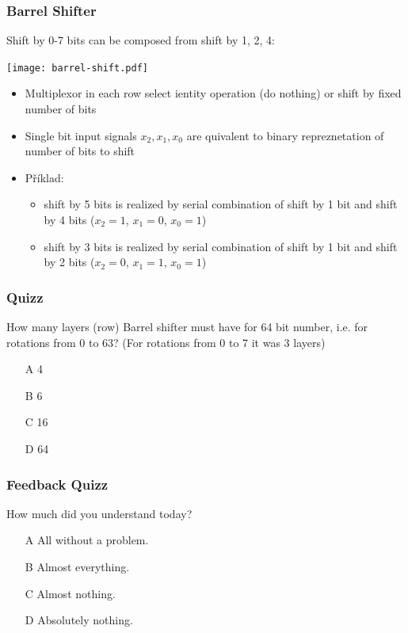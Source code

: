 \documentclass{beamer}
\begin{document}
\begin{frame}
\frametitle{Barrel Shifter}

Shift by 0-7 bits can be composed from shift by 1, 2, 4:
\begin{center}
   \texttt{[image: barrel-shift.pdf]}
\end{center}

\begin{itemize}
\item Multiplexor in each row select ientity operation (do nothing) or shift by fixed number of bits
\item Single bit input signals $x_2,x_1,x_0$ are quivalent to binary repreznetation of number of bits to shift
\item Příklad:
\begin{itemize}
\item shift by 5 bits is realized by serial combination of shift by 1 bit and shift by 4 bits ($x_2=1$, $x_1=0$, $x_0=1$)
\item shift by 3 bits is realized by serial combination of shift by 1 bit and shift by 2 bits ($x_2=0$, $x_1=1$, $x_0=1$)
\end{itemize}
\end{itemize}

\end{frame}


\begin{frame}
\frametitle{Quizz}

How many layers (row) Barrel shifter must have for 64 bit number, i.e. for rotations from 0 to 63? (For rotations from 0 to 7 it was 3 layers)

\begin{itemize}
\item[A] 4
\item[B] 6
\item[C] 16
\item[D] 64
\end{itemize}

\end{frame}


\begin{frame}
\frametitle{Feedback Quizz}

How much did you understand today?
\begin{itemize}
\item[A] All without a problem.
\item[B] Almost everything.
\item[C] Almost nothing.
\item[D] Absolutely nothing.
\end{itemize}

\end{frame}
\end{document}
